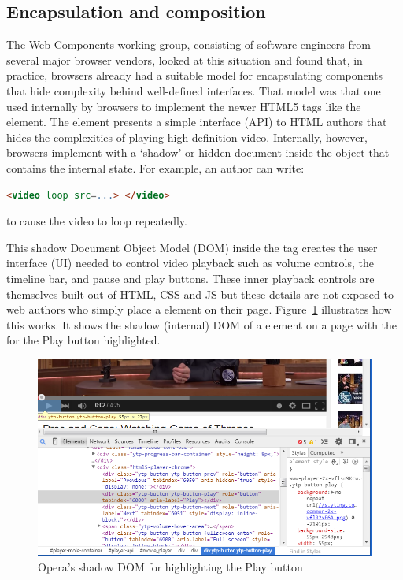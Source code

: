 \subsection{Encapsulation and composition}

The Web Components working group, consisting of software engineers from several major browser vendors, looked at this situation and found that, in practice, browsers already had a suitable model for encapsulating components that hide complexity behind well-defined interfaces.
That model was that one used internally by browsers to implement the newer HTML5 tags like the \textbf{} element. 
The  element presents a simple interface (API) to HTML authors that hides the complexities of playing high definition video.
Internally, however, browsers implement  with a `shadow' or hidden document inside the object that contains the internal state. 
For example, an author can write:
\begin{lstlisting}[language=html]
	<video loop src=...> </video>
\end{lstlisting}
to cause the video to loop repeatedly.

This shadow Document Object Model (DOM) inside the  tag creates the user interface (UI) needed to control video playback such as volume controls, the timeline bar, and pause and play buttons.
These inner playback controls are themselves built out of HTML, CSS and JS but these details are not exposed to web authors who simply place a  element on their page. 
Figure~\ref{f:html5video} illustrates how this works. It shows the shadow (internal) DOM of a  element on a page with the  for the Play button highlighted.

% 
\begin{figure}[htb]
\centering
 \includegraphics[width=5.5in]{images/html5_video_control.png}
\caption{Opera's shadow DOM for  highlighting the Play button}
\label{f:html5video}
\end{figure}
%

